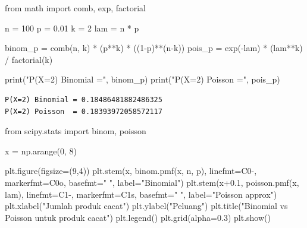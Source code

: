 \documentclass[
  letterpaper,
  DIV=11,
  numbers=noendperiod]{scrreprt}
\newenvironment{Shaded}{\begin{snugshade}}{\end{snugshade}}
\newcommand{\BuiltInTok}[1]{\textcolor[rgb]{0.00,0.23,0.31}{#1}}
\newcommand{\DecValTok}[1]{\textcolor[rgb]{0.68,0.00,0.00}{#1}}
\newcommand{\FloatTok}[1]{\textcolor[rgb]{0.68,0.00,0.00}{#1}}
\newcommand{\ImportTok}[1]{\textcolor[rgb]{0.00,0.46,0.62}{#1}}
\newcommand{\NormalTok}[1]{\textcolor[rgb]{0.00,0.23,0.31}{#1}}
\newcommand{\OperatorTok}[1]{\textcolor[rgb]{0.37,0.37,0.37}{#1}}
\newcommand{\StringTok}[1]{\textcolor[rgb]{0.13,0.47,0.30}{#1}}
\begin{document}
\begin{Shaded}
\begin{Highlighting}[]
\ImportTok{from}\NormalTok{ math }\ImportTok{import}\NormalTok{ comb, exp, factorial}

\NormalTok{n }\OperatorTok{=} \DecValTok{100}
\NormalTok{p }\OperatorTok{=} \FloatTok{0.01}
\NormalTok{k }\OperatorTok{=} \DecValTok{2}
\NormalTok{lam }\OperatorTok{=}\NormalTok{ n }\OperatorTok{*}\NormalTok{ p}

\NormalTok{binom\_p }\OperatorTok{=}\NormalTok{ comb(n, k) }\OperatorTok{*}\NormalTok{ (p}\OperatorTok{**}\NormalTok{k) }\OperatorTok{*}\NormalTok{ ((}\DecValTok{1}\OperatorTok{{-}}\NormalTok{p)}\OperatorTok{**}\NormalTok{(n}\OperatorTok{{-}}\NormalTok{k))}
\NormalTok{pois\_p }\OperatorTok{=}\NormalTok{ exp(}\OperatorTok{{-}}\NormalTok{lam) }\OperatorTok{*}\NormalTok{ (lam}\OperatorTok{**}\NormalTok{k) }\OperatorTok{/}\NormalTok{ factorial(k)}

\BuiltInTok{print}\NormalTok{(}\StringTok{"P(X=2) Binomial ="}\NormalTok{, binom\_p)}
\BuiltInTok{print}\NormalTok{(}\StringTok{"P(X=2) Poisson  ="}\NormalTok{, pois\_p)}
\end{Highlighting}
\end{Shaded}

\begin{verbatim}
P(X=2) Binomial = 0.18486481882486325
P(X=2) Poisson  = 0.18393972058572117
\end{verbatim}

\begin{Shaded}
\begin{Highlighting}[]
\ImportTok{from}\NormalTok{ scipy.stats }\ImportTok{import}\NormalTok{ binom, poisson}

\NormalTok{x }\OperatorTok{=}\NormalTok{ np.arange(}\DecValTok{0}\NormalTok{, }\DecValTok{8}\NormalTok{)}

\NormalTok{plt.figure(figsize}\OperatorTok{=}\NormalTok{(}\DecValTok{9}\NormalTok{,}\DecValTok{4}\NormalTok{))}
\NormalTok{plt.stem(x, binom.pmf(x, n, p), linefmt}\OperatorTok{=}\StringTok{\textquotesingle{}C0{-}\textquotesingle{}}\NormalTok{, markerfmt}\OperatorTok{=}\StringTok{\textquotesingle{}C0o\textquotesingle{}}\NormalTok{, basefmt}\OperatorTok{=}\StringTok{" "}\NormalTok{, label}\OperatorTok{=}\StringTok{"Binomial"}\NormalTok{)}
\NormalTok{plt.stem(x}\OperatorTok{+}\FloatTok{0.1}\NormalTok{, poisson.pmf(x, lam), linefmt}\OperatorTok{=}\StringTok{\textquotesingle{}C1{-}\textquotesingle{}}\NormalTok{, markerfmt}\OperatorTok{=}\StringTok{\textquotesingle{}C1s\textquotesingle{}}\NormalTok{, basefmt}\OperatorTok{=}\StringTok{" "}\NormalTok{, label}\OperatorTok{=}\StringTok{"Poisson approx"}\NormalTok{)}
\NormalTok{plt.xlabel(}\StringTok{"Jumlah produk cacat"}\NormalTok{)}
\NormalTok{plt.ylabel(}\StringTok{"Peluang"}\NormalTok{)}
\NormalTok{plt.title(}\StringTok{"Binomial vs Poisson untuk produk cacat"}\NormalTok{)}
\NormalTok{plt.legend()}
\NormalTok{plt.grid(alpha}\OperatorTok{=}\FloatTok{0.3}\NormalTok{)}
\NormalTok{plt.show()}
\end{Highlighting}
\end{Shaded}
\end{document}
